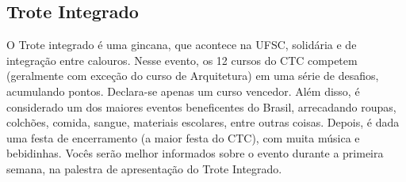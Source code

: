 \subsection{Trote Integrado}
O Trote integrado é uma gincana, que acontece na UFSC, solidária e de integração entre calouros. Nesse evento, os 12 cursos do CTC competem (geralmente com exceção do curso de Arquitetura) em uma série de desafios, acumulando pontos. Declara-se apenas um curso vencedor. Além disso, é considerado um dos maiores eventos beneficentes do Brasil, arrecadando roupas, colchões, comida, sangue, materiais escolares, entre outras coisas. Depois, é dada uma festa de encerramento (a maior festa do CTC), com muita música e bebidinhas. Vocês serão melhor informados sobre o evento durante a primeira semana, na palestra de apresentação do Trote Integrado. 
